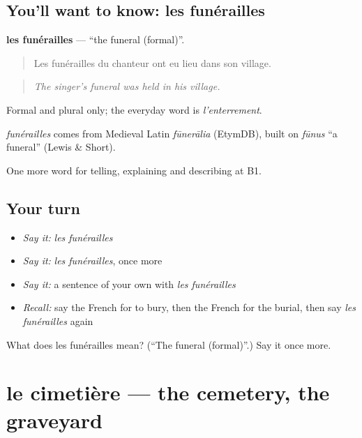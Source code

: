 \subsection*{You'll want to know: les funérailles}
\textbf{les funérailles} — \textquotedblleft{}the funeral (formal)\textquotedblright{}.

\begin{quote}
Les funérailles du chanteur ont eu lieu dans son village.
\end{quote}

\begin{quote}
\emph{The singer's funeral was held in his village.}
\end{quote}

Formal and plural only; the everyday word is \emph{l'enterrement}.

\begin{cousinweb}
\emph{funérailles} comes from Medieval Latin \emph{fūnerālia} (EtymDB), built on \emph{fūnus} \textquotedblleft{}a funeral\textquotedblright{} (Lewis \& Short).
\end{cousinweb}

\begin{grammarlens}[title={What you've built}]
One more word for telling, explaining and describing at B1.
\end{grammarlens}

\subsection*{Your turn}
\begin{itemize}
\raggedright
  \item \emph{Say it:} \emph{les funérailles}
  \item \emph{Say it:} \emph{les funérailles}, once more
  \item \emph{Say it:} a sentence of your own with \emph{les funérailles}
  \item \emph{Recall:} say the French for to bury, then the French for the burial, then say \emph{les funérailles} again
\end{itemize}

\begin{tcolorbox}[breakable,colback=teal!4,colframe=teal!35!black,title={Before you move on}]
What does les funérailles mean? (\textquotedblleft{}The funeral (formal)\textquotedblright{}.) Say it once more.
\end{tcolorbox}
\section[le cimetière]{le cimetière — the cemetery, the graveyard}

